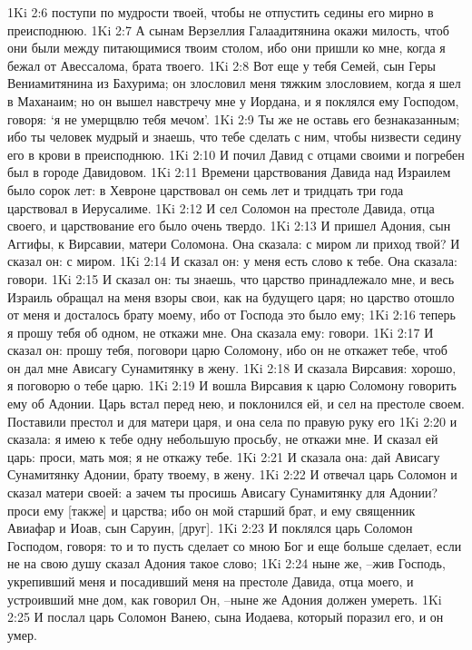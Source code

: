 1Ki 2:6  поступи по мудрости твоей, чтобы не отпустить седины его мирно в преисподнюю.
1Ki 2:7  А сынам Верзеллия Галаадитянина окажи милость, чтоб они были между питающимися твоим столом, ибо они пришли ко мне, когда я бежал от Авессалома, брата твоего.
1Ki 2:8  Вот еще у тебя Семей, сын Геры Вениамитянина из Бахурима; он злословил меня тяжким злословием, когда я шел в Маханаим; но он вышел навстречу мне у Иордана, и я поклялся ему Господом, говоря: `я не умерщвлю тебя мечом'.
1Ki 2:9  Ты же не оставь его безнаказанным; ибо ты человек мудрый и знаешь, что тебе сделать с ним, чтобы низвести седину его в крови в преисподнюю.
1Ki 2:10  И почил Давид с отцами своими и погребен был в городе Давидовом.
1Ki 2:11  Времени царствования Давида над Израилем было сорок лет: в Хевроне царствовал он семь лет и тридцать три года царствовал в Иерусалиме.
1Ki 2:12  И сел Соломон на престоле Давида, отца своего, и царствование его было очень твердо.
1Ki 2:13  И пришел Адония, сын Аггифы, к Вирсавии, матери Соломона. Она сказала: с миром ли приход твой? И сказал он: с миром.
1Ki 2:14  И сказал он: у меня есть слово к тебе. Она сказала: говори.
1Ki 2:15  И сказал он: ты знаешь, что царство принадлежало мне, и весь Израиль обращал на меня взоры свои, как на будущего царя; но царство отошло от меня и досталось брату моему, ибо от Господа это было ему;
1Ki 2:16  теперь я прошу тебя об одном, не откажи мне. Она сказала ему: говори.
1Ki 2:17  И сказал он: прошу тебя, поговори царю Соломону, ибо он не откажет тебе, чтоб он дал мне Ависагу Сунамитянку в жену.
1Ki 2:18  И сказала Вирсавия: хорошо, я поговорю о тебе царю.
1Ki 2:19  И вошла Вирсавия к царю Соломону говорить ему об Адонии. Царь встал перед нею, и поклонился ей, и сел на престоле своем. Поставили престол и для матери царя, и она села по правую руку его
1Ki 2:20  и сказала: я имею к тебе одну небольшую просьбу, не откажи мне. И сказал ей царь: проси, мать моя; я не откажу тебе.
1Ki 2:21  И сказала она: дай Ависагу Сунамитянку Адонии, брату твоему, в жену.
1Ki 2:22  И отвечал царь Соломон и сказал матери своей: а зачем ты просишь Ависагу Сунамитянку для Адонии? проси ему [также] и царства; ибо он мой старший брат, и ему священник Авиафар и Иоав, сын Саруин, [друг].
1Ki 2:23  И поклялся царь Соломон Господом, говоря: то и то пусть сделает со мною Бог и еще больше сделает, если не на свою душу сказал Адония такое слово;
1Ki 2:24  ныне же, --жив Господь, укрепивший меня и посадивший меня на престоле Давида, отца моего, и устроивший мне дом, как говорил Он, --ныне же Адония должен умереть.
1Ki 2:25  И послал царь Соломон Ванею, сына Иодаева, который поразил его, и он умер.
